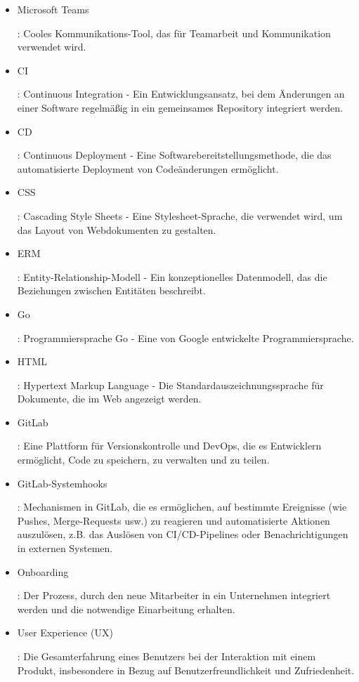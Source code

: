 

\begin{itemize}
    \item \hypertarget{MicrosoftTeams}{Microsoft Teams}: Cooles Kommunikations-Tool, das für Teamarbeit und Kommunikation verwendet wird.
    \item \hypertarget{CI}{CI}: Continuous Integration - Ein Entwicklungsansatz, bei dem Änderungen an einer Software regelmäßig in ein gemeinsames Repository integriert werden.
    \item \hypertarget{CD}{CD}: Continuous Deployment - Eine Softwarebereitstellungsmethode, die das automatisierte Deployment von Codeänderungen ermöglicht.
    \item \hypertarget{CSS}{CSS}: Cascading Style Sheets - Eine Stylesheet-Sprache, die verwendet wird, um das Layout von Webdokumenten zu gestalten.
    \item \hypertarget{ERM}{ERM}: Entity-Relationship-Modell - Ein konzeptionelles Datenmodell, das die Beziehungen zwischen Entitäten beschreibt.
    \item \hypertarget{Go}{Go}: Programmiersprache Go - Eine von Google entwickelte Programmiersprache.
    \item \hypertarget{HTML}{HTML}: Hypertext Markup Language - Die Standardauszeichnungssprache für Dokumente, die im Web angezeigt werden.
    \item \hypertarget{GitLab}{GitLab}: Eine Plattform für Versionskontrolle und DevOps, die es Entwicklern ermöglicht, Code zu speichern, zu verwalten und zu teilen.
    \item \hypertarget{GitLabSystemhooks}{GitLab-Systemhooks}: Mechanismen in GitLab, die es ermöglichen, auf bestimmte Ereignisse (wie Pushes, Merge-Requests usw.) zu reagieren und automatisierte Aktionen auszulösen, z.B. das Auslösen von CI/CD-Pipelines oder Benachrichtigungen in externen Systemen.
    \item \hypertarget{Onboarding}{Onboarding}: Der Prozess, durch den neue Mitarbeiter in ein Unternehmen integriert werden und die notwendige Einarbeitung erhalten.
    \item \hypertarget{UserExperience}{User Experience (UX)}: Die Gesamterfahrung eines Benutzers bei der Interaktion mit einem Produkt, insbesondere in Bezug auf Benutzerfreundlichkeit und Zufriedenheit.

\end{itemize}
